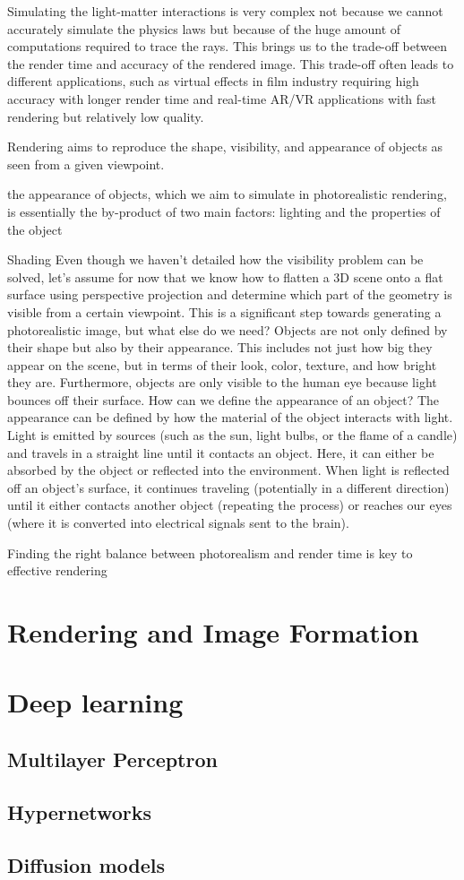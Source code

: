 Simulating the light-matter interactions is very complex not because we cannot accurately simulate the physics laws but because of the huge amount of computations required to trace the rays. This brings us to the trade-off between the render time and accuracy of the rendered image. This trade-off often leads to different applications, such as virtual effects in film industry requiring high accuracy with longer render time and real-time AR/VR applications with fast rendering but relatively low quality.




Rendering aims to reproduce the shape, visibility, and appearance of objects as seen from a given viewpoint. 

the appearance of objects, which we aim to simulate in photorealistic rendering, is essentially the by-product of two main factors: lighting and the properties of the object

Shading
Even though we haven't detailed how the visibility problem can be solved, let's assume for now that we know how to flatten a 3D scene onto a flat surface using perspective projection and determine which part of the geometry is visible from a certain viewpoint. This is a significant step towards generating a photorealistic image, but what else do we need? Objects are not only defined by their shape but also by their appearance. This includes not just how big they appear on the scene, but in terms of their look, color, texture, and how bright they are. Furthermore, objects are only visible to the human eye because light bounces off their surface. How can we define the appearance of an object? The appearance can be defined by how the material of the object interacts with light. Light is emitted by sources (such as the sun, light bulbs, or the flame of a candle) and travels in a straight line until it contacts an object. Here, it can either be absorbed by the object or reflected into the environment. When light is reflected off an object's surface, it continues traveling (potentially in a different direction) until it either contacts another object (repeating the process) or reaches our eyes (where it is converted into electrical signals sent to the brain).

Finding the right balance between photorealism and render time is key to effective rendering


\section{Rendering and Image Formation}
\section{Deep learning}
\subsection{Multilayer Perceptron}
\subsection{Hypernetworks}
\subsection{Diffusion models}